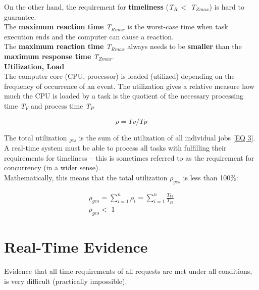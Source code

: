 On the other hand, the requirement for \textbf{timeliness} (\textit{T${}_{R\ }$}$\mathrm{<}$ \textit{T${}_{Zmax}$}) is hard to guarantee. \\

The \textbf{maximum reaction time} \textit{T${}_{Rmax}$} is the worst-case time when task execution ends and the computer can cause a reaction. \\

The \textbf{maximum reaction time} \textit{T${}_{Rmax}$} always needs to be \textbf{smaller} than the \textbf{maximum response time} \textit{T${}_{Zmax}$}.\\

{\rot\bf Utilization, Load}\\

The computer core (CPU, processor) is loaded (utilized) depending on the frequency of occurrence of an event. The utilization  gives a relative measure how much the CPU is loaded by a task is the quotient of the necessary processing time \textit{T${}_{V}$} and process time \textit{T${}_{P}$}

\begin{equation}
	\rho = Tv/Tp
\label{EQ 2}
\end{equation}
	
The total utilization ${}_{ges}$ is the sum of the utilization of all individual jobs \ref{EQ 3}. A real-time system must be able to process all tasks with fulfilling their requirements for timeliness -- this is sometimes referred to as the requirement for concurrency (in a wider sense).\\

 Mathematically, this means that the total utilization \textit{${\rho}_{ges}$} is less than 100\%:

\begin{equation}
	\begin{array}{l} {\rho _{ges} =\sum _{i=1}^{n}\rho _{i} = \sum _{i=1}^{n}\frac{T_{Vi} }{T_{Pi} }  } \\ {\rho _{ges} <\, \, 1} \end{array}
\label{EQ 3}
\end{equation}
\newpage

\section{Real-Time Evidence}

Evidence that all time requirements of all requests are met under all conditions, is very difficult (practically impossible). \\

